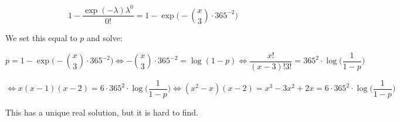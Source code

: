 \begin{enumerate}[(a)]
\[
1 - \frac{\exp(-\lambda) \lambda^0}{0!} = 1 - \exp \bigg(-\binom{x}{3} \cdot 365^{-2} \bigg)
\]

We set this equal to \(p\) and solve:

\[
p = 1 - \exp \bigg(-\binom{x}{3} \cdot 365^{-2} \bigg) \iff -\binom{x}{3} \cdot 365^{-2}  = \log(1-p) \iff \frac{x!}{(x-3)!3!} = 365^2 \cdot \log \bigg(\frac{1}{1-p} \bigg)
\]

\[
\iff x(x-1)(x-2) = 6 \cdot 365^2 \cdot \log \bigg(\frac{1}{1-p} \bigg) \iff (x^2-x)(x-2) =  x^3 - 3x^2 + 2x = 6 \cdot 365^2 \cdot \log \bigg(\frac{1}{1-p} \bigg) 
\]

This has a unique real solution, but it is hard to find.

\end{enumerate}

%
%
%
%
%
%
%
%

%



